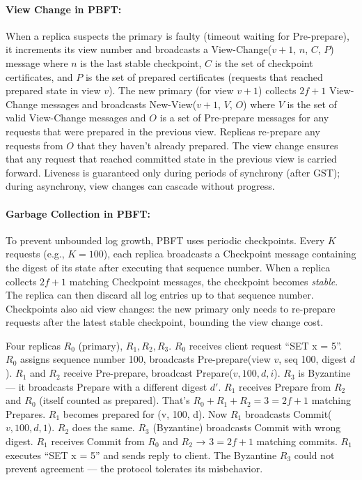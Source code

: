 \paragraph{View Change in PBFT:}
When a replica suspects the primary is faulty (timeout waiting for Pre-prepare), it increments its view number and broadcasts a View-Change($v+1$, $n$, $C$, $P$) message where $n$ is the last stable checkpoint, $C$ is the set of checkpoint certificates, and $P$ is the set of prepared certificates (requests that reached prepared state in view $v$). The new primary (for view $v+1$) collects $2f+1$ View-Change messages and broadcasts New-View($v+1$, $V$, $O$) where $V$ is the set of valid View-Change messages and $O$ is a set of Pre-prepare messages for any requests that were prepared in the previous view. Replicas re-prepare any requests from $O$ that they haven't already prepared. The view change ensures that any request that reached committed state in the previous view is carried forward. Liveness is guaranteed only during periods of synchrony (after GST); during asynchrony, view changes can cascade without progress.

\paragraph{Garbage Collection in PBFT:}
To prevent unbounded log growth, PBFT uses periodic checkpoints. Every $K$ requests (e.g., $K = 100$), each replica broadcasts a Checkpoint message containing the digest of its state after executing that sequence number. When a replica collects $2f+1$ matching Checkpoint messages, the checkpoint becomes \emph{stable}. The replica can then discard all log entries up to that sequence number. Checkpoints also aid view changes: the new primary only needs to re-prepare requests after the latest stable checkpoint, bounding the view change cost.

\begin{example}[PBFT with $n = 4, f = 1$]
Four replicas $R_0$ (primary), $R_1, R_2, R_3$. $R_0$ receives client request ``SET x = 5''. $R_0$ assigns sequence number 100, broadcasts Pre-prepare(view $v$, seq 100, digest $d$). $R_1$ and $R_2$ receive Pre-prepare, broadcast Prepare($v, 100, d, i$). $R_3$ is Byzantine — it broadcasts Prepare with a different digest $d'$. $R_1$ receives Prepare from $R_2$ and $R_0$ (itself counted as prepared). That's $R_0 + R_1 + R_2 = 3 = 2f+1$ matching Prepares. $R_1$ becomes prepared for (v, 100, d). Now $R_1$ broadcasts Commit($v, 100, d, 1$). $R_2$ does the same. $R_3$ (Byzantine) broadcasts Commit with wrong digest. $R_1$ receives Commit from $R_0$ and $R_2$ → $3 = 2f+1$ matching commits. $R_1$ executes ``SET x = 5'' and sends reply to client. The Byzantine $R_3$ could not prevent agreement — the protocol tolerates its misbehavior.
\end{example}

